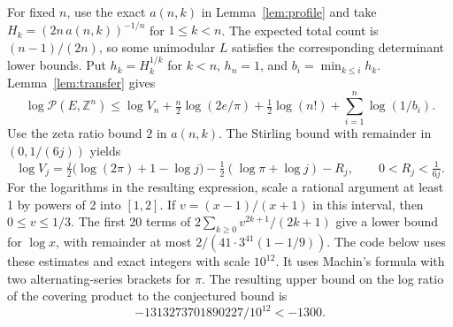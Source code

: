 \documentclass[11pt]{article}
\newcommand{\Z}{\mathbb Z}
\newcommand{\Pcov}{\mathcal P}
\begin{document}
For fixed \(n\), use the exact \(a(n,k)\) in Lemma~\ref{lem:profile}
and take \(H_k=(2n\,a(n,k))^{-1/n}\) for \(1\le k<n\).
The expected total count is \((n-1)/(2n)\), so some unimodular \(L\)
satisfies the corresponding determinant lower bounds. Put
\(h_k=H_k^{1/k}\) for \(k<n\), \(h_n=1\), and
\(b_i=\min_{k\le i}h_k\). Lemma~\ref{lem:transfer} gives
\[
 \log \Pcov(E,\Z^n)
 \le \log V_n+\tfrac n2\log(2e/\pi)
                +\tfrac12\log(n!)+\sum_{i=1}^n\log(1/b_i).
\]
Use the zeta ratio bound \(2\) in \(a(n,k)\). The Stirling bound
with remainder in \((0,1/(6j))\) yields
\[
 \log V_j=
 \tfrac j2\bigl(\log(2\pi)+1-\log j\bigr)
  -\tfrac12(\log\pi+\log j)-R_j,\qquad 0<R_j<\tfrac1{6j}.
\]
For the logarithms in the resulting expression, scale a rational
argument at least 1 by powers of 2 into \([1,2]\). If
\(v=(x-1)/(x+1)\) in this interval, then \(0\le v\le1/3\). The
first 20 terms of \(2\sum_{k\ge0}v^{2k+1}/(2k+1)\) give a lower
bound for \(\log x\), with remainder at most
\(2/(41\cdot 3^{41}(1-1/9))\).
The code below uses these estimates and exact integers with scale
\(10^{12}\). It uses Machin's formula with two alternating-series
brackets for \(\pi\). The resulting upper bound on the log ratio of
the covering product to the conjectured bound is
\[
 -1313273701890227/10^{12} < -1300 .
\]
\end{document}
